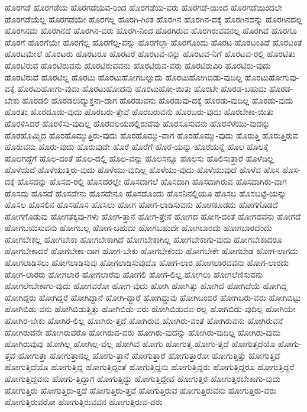 {ಹೊರಗಡೆ
ಹೊರಗಡೆಯ
ಹೊರಗಡೆಯವ-ರಿಂದ
ಹೊರಗಡೆಯ-ವರು
ಹೊರಗಡೆ-ಯಿಂದ
ಹೊರಗಡೆಯಿಂದಲೇ
ಹೊರಗಡೆಯೆಲ್ಲ
ಹೊರಗಡೆಯೇ
ಹೊರಗಲ್ಲ
ಹೊರಗಿ-ಗಿಂತ
ಹೊರಗಿನ
ಹೊರಗಿನ-ದಕ್ಕೆ
ಹೊರಗಿನದನ್ನು
ಹೊರಗಿನದಲ್ಲ
ಹೊರಗಿನದು
ಹೊರಗಿನದೆ
ಹೊರಗಿನ-ವರು
ಹೊರಗಿ-ನಿಂದ
ಹೊರಗಿರುವ
ಹೊರಗಿರುವವನಲ್ಲ
ಹೊರಗಿವೆ
ಹೊರಗೂ
ಹೊರಗೆ
ಹೊರಗೆಯೇ
ಹೊರಗೆಲ್ಲ
ಹೊರಗೆಲ್ಲ-ವನ್ನು
ಹೊರಗೆಲ್ಲಾ
ಹೊರಗೊಂದು
ಹೊರಟ
ಹೊರಟಂತಿದೆ
ಹೊರಟಂತೆ
ಹೊರಟಮೇಲೆ
ಹೊರಟರು
ಹೊರಟರೂ
ಹೊರಟರೆ
ಹೊರಟವ-ನನ್ನು
ಹೊರಟವ-ನಿಗೆ
ಹೊರಟವ-ರಲ್ಲಿ
ಹೊರಟಿತು
ಹೊರಟಿರುವ
ಹೊರಟಿರುವನು
ಹೊರಟಿರುವವನು
ಹೊರಟಿರುವ-ವರು
ಹೊರಟಿರುವಿರಿ
ಹೊರಟಿರು-ವುದು
ಹೊರಟಿರುವೆ
ಹೊರಟಿಲ್ಲ
ಹೊರಟು
ಹೊರಟುಹೋಗಬಲ್ಲುದು
ಹೊರಟುಹೋಗಿಬಿಡು-ವುದಿಲ್ಲ
ಹೊರಟುಹೋಗುವು-ದಕ್ಕೆ
ಹೊರಟುಹೋಗು-ವುದು
ಹೊರಟುಹೋದನು
ಹೊರಟುಹೋ-ಯಿತು
ಹೊರಟೇ
ಹೊರಡ-ಬಹುದು
ಹೊರಡ-ಬೇಕು
ಹೊರಡಲಿ
ಹೊರಡಲುದ್ಯುಕ್ತನಾ-ದಾಗ
ಹೊರಡುವನು
ಹೊರಡುವು-ದಕ್ಕೆ
ಹೊರಡು-ವುದಿಲ್ಲ
ಹೊರಡು-ವುದು
ಹೊರತು
ಹೊರದೂಡು-ವುದು
ಹೊರಬರು-ತ್ತೇವೆ
ಹೊರಬರುವನು
ಹೊರಬರು-ವುದು
ಹೊರಬೇಕಾ-ಯಿತು
ಹೊರಳಿಸಿದರೆ
ಹೊರಳಿಸು-ವುದಿಲ್ಲ
ಹೊರವಲಯದಲ್ಲಿರುವೆವು
ಹೊರಸೂಸುವನು
ಹೊರಸೆಳೆಯು-ವುದನ್ನು
ಹೊರಹೊಮ್ಮಿದ
ಹೊರಹೊಮ್ಮುತ್ತಿರು-ವುದು
ಹೊರಹೊಮ್ಮು-ವಾಗ
ಹೊರಹೊಮ್ಮು-ವುದು
ಹೊರುತ್ತಿ
ಹೊರುತ್ತಿರುವ
ಹೊರುವನು
ಹೊರು-ವುದು
ಹೊರುವುದೇ
ಹೊರೆ
ಹೊರೆಗೆ
ಹೊರೆ-ಯನ್ನು
ಹೊರೆಯನ್ನೆ
ಹೊಲ
ಹೊಲಕ್ಕೆ
ಹೊಲಗದ್ದೆಗೆ
ಹೊಲ-ದಂತೆ
ಹೊಲ-ದಲ್ಲಿ
ಹೊಲ-ವನ್ನು
ಹೊಲಸನ್ನೂ
ಹೊಲಸು
ಹೊಲಿಸುತ್ತಾರೆ
ಹೊಳೆದಿಲ್ಲ
ಹೊಳೆಯದೆ
ಹೊಳೆಯುತ್ತಿರು-ವುದು
ಹೊಳೆಯು-ವುದಿಲ್ಲ
ಹೊಳೆಯು-ವುದು
ಹೊಳೆಯುವುದೆ
ಹೊಳೆವ
ಹೊಸ
ಹೊಸ-ದಕ್ಕೆ
ಹೊಸದನ್ನು
ಹೊಸದ-ರಲ್ಲಿ
ಹೊಸದರಲ್ಲೇ
ಹೊಸದಾಗಲೆ
ಹೊಸದಾಗಿ
ಹೊಸದಾಗಿರುವ
ಹೊಸದಾಗಿರು-ವಾಗ
ಹೊಸದು
ಹೊಸದೆ
ಹೊಸದೇನು
ಹೊಸದೇನೂ
ಹೊಸದೊಂದು
ಹೊಸನಿನಲ್ಲಿಯೂ
ಹೊಸಬ
ಹೊಸಬಟ್ಟೆ-ಯನ್ನು
ಹೊಸಲ
ಹೊಸಲಿನ
ಹೊಸಹೊಸ
ಹೊಸಿಲು
ಹೋಗ
ಹೋಗ-ಲಾಡಿಸುವನು
ಹೋಗಕೂಡದು
ಹೋಗಗೊಡದೆ
ಹೋಗಗೊಡುವು
ಹೋಗತಕ್ಕವು-ಗಳು
ಹೋಗ-ತ್ತಾನೆ
ಹೋಗ-ತ್ತೇನೆ
ಹೋಗದ
ಹೋಗ-ದಂತೆ
ಹೋಗದವನು
ಹೋಗದೆ
ಹೋಗಬಯಸುವನು
ಹೋಗಬಲ್ಲ
ಹೋಗ-ಬಹುದು
ಹೋಗಬಹುದೇ
ಹೋಗಬಾರದು
ಹೋಗಬಾರದೆಂದು
ಹೋಗಬೇಕಲ್ಲ
ಹೋಗಬೇಕಾ
ಹೋಗಬೇಕಾಗಿದೆ
ಹೋಗಬೇಕಾಗಿಲ್ಲ
ಹೋಗಬೇಕಾಗು-ವುದು
ಹೋಗಬೇಕಾದರೂ
ಹೋಗಬೇಕಾದರೆ
ಹೋಗಬೇಕಾ-ದಾಗ
ಹೋಗ-ಬೇಕು
ಹೋಗಬೇಕೆಂದು
ಹೋಗಬೇಕೇ
ಹೋಗಬೇಡ
ಹೋಗ-ಲಾಗದು
ಹೋಗಲಾಡಿಸಲು
ಹೋಗಲಾಡಿಸುವು
ಹೋಗಲಾಡಿಸುವುದೊ
ಹೋಗ-ಲಾರ
ಹೋಗಲಾರದವನು
ಹೋಗ-ಲಾರದು
ಹೋಗ-ಲಾರರು
ಹೋಗಲಾರೆ
ಹೋಗಲಾರೆವು
ಹೋಗಲಿ
ಹೋಗ-ಲಿಲ್ಲ
ಹೋಗಲು
ಹೋಗಲೆಣಿಸುವನು
ಹೋಗಲೇಬೇಕಾಗು-ವುದು
ಹೋಗವರೋ
ಹೋಗ-ವುದು
ಹೋಗಿ
ಹೋಗಿತ್ತು
ಹೋಗಿದೆ
ಹೋಗಿದೆಯೆ
ಹೋಗಿದ್ದ
ಹೋಗಿದ್ದರು
ಹೋಗಿದ್ದರೆ
ಹೋಗಿದ್ದಾನೆ
ಹೋಗಿ-ದ್ದಾರೆ
ಹೋಗಿದ್ದುವು
ಹೋಗಿಬಂದರೆ
ಹೋಗಿಬರು-ವರು
ಹೋಗಿಬಿಟ್ಟು
ಹೋಗಿಬಿಡು-ವನು
ಹೋಗಿಬಿಡುತ್ತಿತ್ತು
ಹೋಗಿಬಿಡು-ವರು
ಹೋಗಿಬಿಡುವವ-ರಲ್ಲ
ಹೋಗಿಬಿಡು-ವುದಿಲ್ಲ
ಹೋಗಿಯೇ
ಹೋಗಿರ-ಬೇಕು
ಹೋಗಿರ-ಲಿಲ್ಲ
ಹೋಗಿರು-ತ್ತದೆ
ಹೋಗಿರುವ
ಹೋಗಿರು-ವಂತೆ
ಹೋಗಿರುವನು
ಹೋಗಿರುವನೆ
ಹೋಗಿರುವನೇ
ಹೋಗಿರುವರೊ
ಹೋಗಿರುವ-ವರು
ಹೋಗಿರು-ವುದನ್ನು
ಹೋಗಿರು-ವುದಿಲ್ಲ
ಹೋಗಿರು-ವುದು
ಹೋಗಿರುವುವು
ಹೋಗಿಲ್ಲ
ಹೋಗಿಲ್ಲ-ವಲ್ಲ
ಹೋಗಿವೆ
ಹೋಗು
ಹೋಗುತ್ತ
ಹೋಗು-ತ್ತದೆ
ಹೋಗುತ್ತದೆಯೊ
ಹೋಗು-ತ್ತವೆ
ಹೋಗುತ್ತಾ
ಹೋಗುತ್ತಾನಲ್ಲ
ಹೋಗು-ತ್ತಾನೆ
ಹೋಗುತ್ತಾರೆ
ಹೋಗುತ್ತಾರೋ
ಹೋಗುತ್ತಿತ್ತು
ಹೋಗುತ್ತಿದೆ
ಹೋಗುತ್ತಿದೆಯೊ
ಹೋಗುತ್ತಿದ್ದ
ಹೋಗುತ್ತಿದ್ದಂತೆ
ಹೋಗುತ್ತಿದ್ದನು
ಹೋಗುತ್ತಿದ್ದರು
ಹೋಗುತ್ತಿದ್ದರೂ
ಹೋಗುತ್ತಿದ್ದರೆ
ಹೋಗುತ್ತಿದ್ದವನು
ಹೋಗು-ತ್ತಿದ್ದಾಗ
ಹೋಗುತ್ತಿದ್ದು
ಹೋಗುತ್ತಿದ್ದೇವೆ
ಹೋಗುತ್ತಿರ
ಹೋಗುತ್ತಿರಬೇಕಾಗು-ವುದು
ಹೋಗುತ್ತಿರು
ಹೋಗುತ್ತಿರು-ತ್ತದೆ
ಹೋಗುತ್ತಿರು-ತ್ತವೆ
ಹೋಗುತ್ತಿರುವ
ಹೋಗುತ್ತಿರುವನು
ಹೋಗುತ್ತಿರು-ವರು
ಹೋಗುತ್ತಿರುವರೋ
ಹೋಗುತ್ತಿರುವವನ
ಹೋಗುತ್ತಿರುವ-ವರು
}
